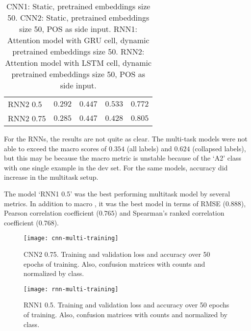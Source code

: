 \begin{table}
\begin{tabular}{lrrrr}
    RNN2 0.5  &         $0.292$  &         $0.447$  &         $0.533$  &         $0.772$  \\
    RNN2 0.75 &         $0.285$  &         $0.447$  &         $0.428$  &         $0.805$  \\
    \bottomrule
  \end{tabular}
  \caption{CNN1: Static, pretrained embeddings size 50.
           CNN2: Static, pretrained embeddings size 50, POS as side input.
           RNN1: Attention model with GRU cell, dynamic pretrained
           embeddings size 50.
           RNN2: Attention model with LSTM cell, dynamic pretrained
           embeddings size 50, POS as side input.}
  \label{tab:multitask-results}
\end{table}

For the RNNs, the results are not quite as clear. The multi-task models were
not able to exceed the macro \FI scores of $0.354$ (all labels) and $0.624$
(collapsed labels), but this may be because the macro \FI metric is unstable
because of the `A2' class with one single example in the dev set. For the
same models, accuracy did increase in the multitask setup.

The model `RNN1 0.5' was the best performing multitask model by several
metrics. In addition to macro \FI, it was the best model in terms of RMSE
($0.888$), Pearson correlation coefficient ($0.765$) and Spearman's ranked
correlation coefficient ($0.768$).


\begin{figure}
  \centering
  \texttt{[image: cnn-multi-training]}
  \caption{CNN2 0.75. Training and validation loss and accuracy over 50 epochs of training.
           Also, confusion matrices with counts and normalized by class.}
  \label{fig:cnn-multi-training}
\end{figure}


\begin{figure}
  \centering
  \texttt{[image: rnn-multi-training]}
  \caption{RNN1 0.5. Training and validation loss and accuracy over 50 epochs of training.
           Also, confusion matrices with counts and normalized by class.}
  \label{fig:rnn-multi-training}
\end{figure}
